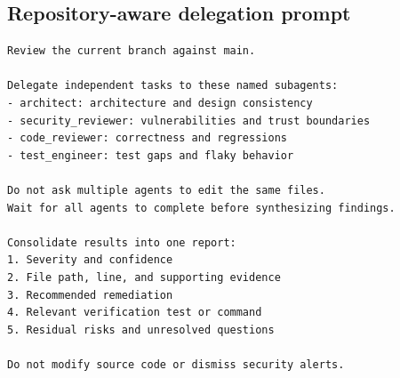 \documentclass[11pt,letterpaper]{article}
\begin{document}
\subsection{Repository-aware delegation prompt}
\begin{listing}[htbp]
\caption{Example instruction issued to the parent Codex agent.}
\begin{verbatim}
Review the current branch against main.

Delegate independent tasks to these named subagents:
- architect: architecture and design consistency
- security_reviewer: vulnerabilities and trust boundaries
- code_reviewer: correctness and regressions
- test_engineer: test gaps and flaky behavior

Do not ask multiple agents to edit the same files.
Wait for all agents to complete before synthesizing findings.

Consolidate results into one report:
1. Severity and confidence
2. File path, line, and supporting evidence
3. Recommended remediation
4. Relevant verification test or command
5. Residual risks and unresolved questions

Do not modify source code or dismiss security alerts.
\end{verbatim}
\end{listing}
\end{document}
